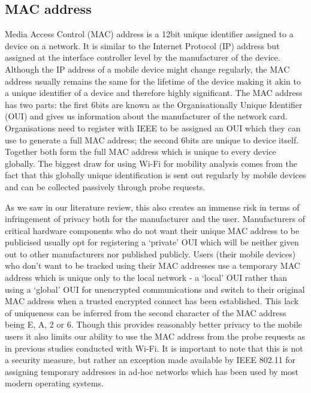 \subsection{MAC address}
Media Access Control (MAC) address is a 12bit unique identifier assigned to a device on a network.
It is similar to the Internet Protocol (IP) address but assigned at the interface controller level by the manufacturer of the device.
Although the IP address of a mobile device might change regularly, the MAC address usually remains the same for the lifetime of the device making it akin to a unique identifier of a device and therefore highly significant.
The MAC address has two parts: the first 6bits are known as the Organisationally Unique Identifier (OUI) and gives us information about the manufacturer of the network card.
Organisations need to register with IEEE to be assigned an OUI which they can use to generate a full MAC address;
the second 6bits are unique to device itself.
Together both form the full MAC address which is unique to every device globally.
The biggest draw for using Wi-Fi for mobility analysis comes from the fact that this globally unique identification is sent out regularly by mobile devices and can be collected passively through probe requests.

As we saw in our literature review, this also creates an immense risk in terms of infringement of privacy both for the manufacturer and the user.
Manufacturers of critical hardware components who do not want their unique MAC address to be publicised usually opt for registering a `private' OUI which will be neither given out to other manufacturers nor published publicly.
Users (their mobile devices) who don't want to be tracked using their MAC addresses use a temporary MAC address which is unique only to the local network - a `local' OUI rather than using a `global' OUI for unencrypted communications and switch to their original MAC address when a trusted encrypted connect has been established.
This lack of uniqueness can be inferred from the second character of the MAC address being E, A, 2 or 6.
Though this provides reasonably better privacy to the mobile users it also limits our ability to use the MAC address from the probe requests as in previous studies conducted with Wi-Fi.
It is important to note that this is not a security measure, but rather an exception made available by IEEE 802.11 for assigning temporary addresses in ad-hoc networks which has been used by most modern operating systems.


